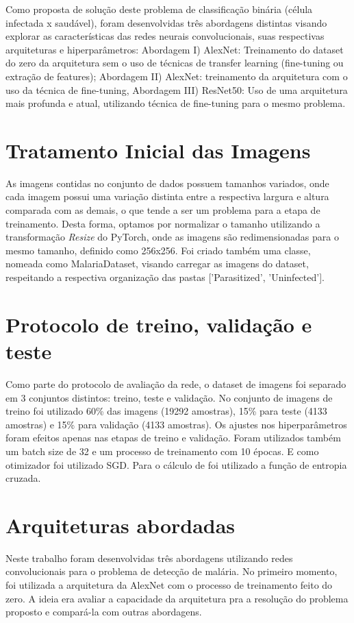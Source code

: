 \documentclass{sigchi}
\begin{document}
Como proposta de solução deste problema de classificação binária (célula infectada x saudável), foram desenvolvidas três abordagens distintas visando explorar as características das redes neurais convolucionais, suas respectivas arquiteturas e hiperparâmetros: Abordagem I) AlexNet: Treinamento do dataset do zero da arquitetura sem o uso de técnicas de transfer learning (fine-tuning ou extração de features); Abordagem II) AlexNet: treinamento da arquitetura com o uso da técnica de fine-tuning, Abordagem III) ResNet50: Uso de uma arquitetura mais profunda e atual, utilizando técnica de fine-tuning para o mesmo problema.

\section{Tratamento Inicial das Imagens}
As imagens contidas no conjunto de dados possuem tamanhos variados, onde cada imagem possui uma variação distinta entre a respectiva largura e altura comparada com as demais, o que tende a ser um problema para a etapa de treinamento. Desta forma, optamos por normalizar o tamanho utilizando a transformação \textit{Resize} do PyTorch, onde as imagens são redimensionadas para o mesmo tamanho, definido como 256x256. Foi criado também uma classe, nomeada como MalariaDataset, visando carregar as imagens do dataset, respeitando a respectiva organização das pastas ['Parasitized', 'Uninfected'].

\section{Protocolo de treino, validação e teste}
Como parte do protocolo de avaliação da rede, o dataset de imagens foi separado em 3 conjuntos distintos: treino, teste e validação. No conjunto de imagens de treino foi utilizado 60\% das imagens (19292 amostras), 15\% para teste (4133 amostras) e 15\% para validação (4133 amostras). Os ajustes nos hiperparâmetros foram efeitos apenas nas etapas de treino e validação. Foram utilizados também um batch size de 32 e um processo de treinamento com 10 épocas. E como otimizador foi utilizado SGD. Para o cálculo de  foi utilizado a função de entropia cruzada.

\section{Arquiteturas abordadas}
Neste trabalho foram desenvolvidas três abordagens utilizando redes convolucionais para o problema de detecção de malária. No primeiro momento, foi utilizada a arquitetura da AlexNet com o processo de treinamento feito do zero. A ideia era avaliar a capacidade da arquitetura pra a resolução do problema proposto e compará-la com outras abordagens.
\end{document}
